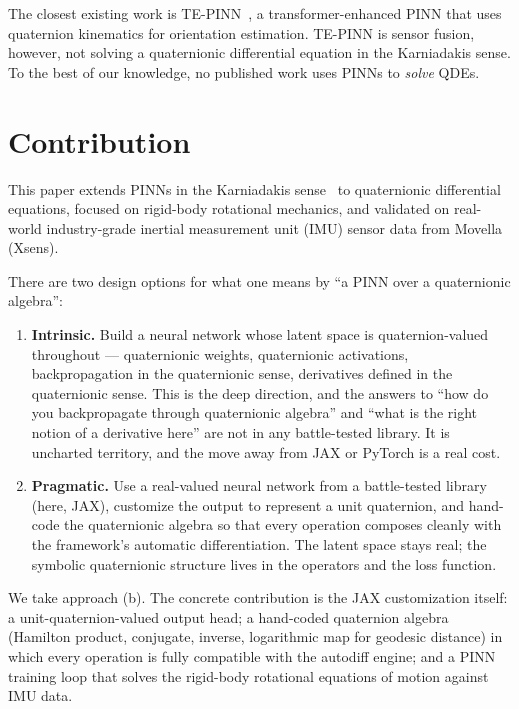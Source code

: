 \documentclass[11pt]{article}
\begin{document}
The closest existing work is TE-PINN~\cite{TEPINN2024}, a transformer-enhanced PINN that uses quaternion kinematics for orientation estimation. TE-PINN is sensor fusion, however, not solving a quaternionic differential equation in the Karniadakis sense. To the best of our knowledge, no published work uses PINNs to \emph{solve} QDEs.

\section{Contribution}

This paper extends PINNs in the Karniadakis sense~\cite{Raissi2019PINN} to quaternionic differential equations, focused on rigid-body rotational mechanics, and validated on real-world industry-grade inertial measurement unit (IMU) sensor data from Movella (Xsens).

There are two design options for what one means by ``a PINN over a quaternionic algebra'':

\begin{enumerate}
\item[(a)] \textbf{Intrinsic.} Build a neural network whose latent space is quaternion-valued throughout --- quaternionic weights, quaternionic activations, backpropagation in the quaternionic sense, derivatives defined in the quaternionic sense. This is the deep direction, and the answers to ``how do you backpropagate through quaternionic algebra'' and ``what is the right notion of a derivative here'' are not in any battle-tested library. It is uncharted territory, and the move away from JAX or PyTorch is a real cost.
\item[(b)] \textbf{Pragmatic.} Use a real-valued neural network from a battle-tested library (here, JAX), customize the output to represent a unit quaternion, and hand-code the quaternionic algebra so that every operation composes cleanly with the framework's automatic differentiation. The latent space stays real; the symbolic quaternionic structure lives in the operators and the loss function.
\end{enumerate}

We take approach (b). The concrete contribution is the JAX customization itself: a unit-quaternion-valued output head; a hand-coded quaternion algebra (Hamilton product, conjugate, inverse, logarithmic map for geodesic distance) in which every operation is fully compatible with the autodiff engine; and a PINN training loop that solves the rigid-body rotational equations of motion against IMU data.
\end{document}
